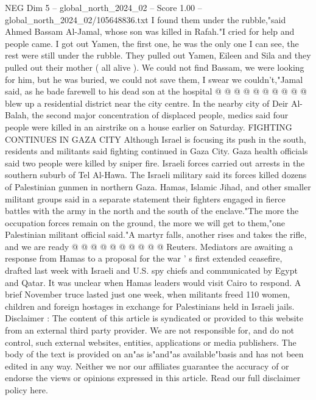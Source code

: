 \begin{textsample}{NEG Dim 5 – global\_north\_2024\_02 – Score 1.00 – global\_north\_2024\_02/105648836.txt}
I found them under the rubble,"said Ahmed Bassam Al-Jamal, whose son was killed in Rafah."I cried for help and people came.
I got out Yamen, the first one, he was the only one I can see, the rest were still under the rubble.
They pulled out Yamen, Eileen and Sila and they pulled out their mother ( all alive ).
We could not find Bassam, we were looking for him, but he was buried, we could not save them, I swear we couldn't,"Jamal said, as he bade farewell to his dead son at the hospital @ @ @ @ @ @ @ @ @ @ blew up a residential district near the city centre.
In the nearby city of Deir Al-Balah, the second major concentration of displaced people, medics said four people were killed in an airstrike on a house earlier on Saturday.
FIGHTING CONTINUES IN GAZA CITY Although Israel is focusing its push in the south, residents and militants said fighting continued in Gaza City.
Gaza health officials said two people were killed by sniper fire.
Israeli forces carried out arrests in the southern suburb of Tel Al-Hawa.
The Israeli military said its forces killed dozens of Palestinian gunmen in northern Gaza.
Hamas, Islamic Jihad, and other smaller militant groups said in a separate statement their fighters engaged in fierce battles with the army in the north and the south of the enclave."The more the occupation forces remain on the ground, the more we will get to them,"one Palestinian militant official said."A martyr falls, another rises and takes the rifle, and we are ready @ @ @ @ @ @ @ @ @ @ Reuters.
Mediators are awaiting a response from Hamas to a proposal for the war ' s first extended ceasefire, drafted last week with Israeli and U.S. spy chiefs and communicated by Egypt and Qatar.
It was unclear when Hamas leaders would visit Cairo to respond.
A brief November truce lasted just one week, when militants freed 110 women, children and foreign hostages in exchange for Palestinians held in Israeli jails.
Disclaimer : The content of this article is syndicated or provided to this website from an external third party provider.
We are not responsible for, and do not control, such external websites, entities, applications or media publishers.
The body of the text is provided on an"as is"and"as available"basis and has not been edited in any way.
Neither we nor our affiliates guarantee the accuracy of or endorse the views or opinions expressed in this article.
Read our full disclaimer policy here.

\end{textsample}
